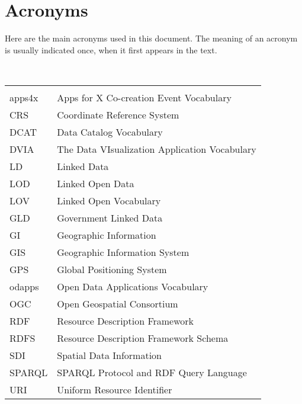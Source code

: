 

\chapter*{Acronyms}

Here are the main acronyms used in this document. The meaning of an acronym is usually indicated once, when it first appears in the text. 

 \\

\begin{longtable}{lp{11cm}}
  &\\
  apps4x	 & Apps for X Co-creation Event Vocabulary\\
  CRS &  Coordinate Reference System\\
  
  DCAT & 	Data Catalog Vocabulary\\
  DVIA & The Data VIsualization Application Vocabulary\\
  
  
  LD  &  Linked Data\\
  LOD &  Linked Open Data\\ 
  
  
  LOV &  Linked Open Vocabulary\\
  
  GLD &  Government Linked Data\\
  GI  &  Geographic Information\\
  GIS &  Geographic Information System\\
  GPS & Global Positioning System \\
  
  odapps	 & Open Data Applications Vocabulary\\
  OGC & Open Geospatial Consortium\\
  
  RDF & Resource Description Framework\\
  RDFS & 	Resource Description Framework Schema\\
  SDI &  Spatial Data Information\\
  SPARQL	 & SPARQL Protocol and RDF Query Language\\
  
  URI &	Uniform Resource Identifier\\
  







  
  
 
\end{longtable}
